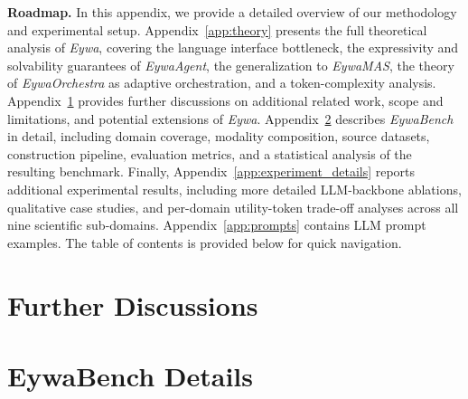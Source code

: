 \clearpage

{}

\textbf{Roadmap.} 
In this appendix, we provide a detailed overview of our methodology and experimental setup. 
Appendix~\ref{app:theory} presents the full theoretical analysis of \textit{Eywa}, covering the language interface bottleneck, the expressivity and solvability guarantees of \textit{EywaAgent}, the generalization to \textit{EywaMAS}, the theory of \textit{EywaOrchestra} as adaptive orchestration, and a token-complexity analysis.
Appendix~\ref{app:further_discussion} provides further discussions on additional related work, scope and limitations, and potential extensions of \textit{Eywa}.
Appendix~\ref{sec:dataset_details} describes \textit{EywaBench} in detail, including domain coverage, modality composition, source datasets, construction pipeline, evaluation metrics, and a statistical analysis of the resulting benchmark.
Finally, Appendix~\ref{app:experiment_details} reports additional experimental results, including more detailed LLM-backbone ablations, qualitative case studies, and per-domain utility-token trade-off analyses across all nine scientific sub-domains. Appendix~\ref{app:prompts} contains LLM prompt examples.
The table of contents is provided below for quick navigation.

\renewcommand\contentsname{\Large Table of Contents}



\tableofcontents
\clearpage





\clearpage

\section{Further Discussions}
\label{app:further_discussion}






\section{EywaBench Details}
\label{sec:dataset_details}





